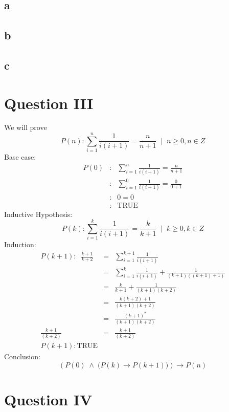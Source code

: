 \documentclass{article}
\begin{document}
\subsection*{a}

\subsection*{b}

\subsection*{c}

\section*{Question III}
We will prove
$$
P(n) \colon \sum^n_{i=1} \frac{1}{i(i+1)} = \frac{n}{n+1} \;\; \biggr | \;\; n \geq 0, n \in Z
$$
Base case:
\begin{eqnarray*}
P(0) &\colon& \sum^n_{i=1} \frac{1}{i(i+1)} = \frac{n}{n+1} \\
&\colon& \sum^0_{i=1} \frac{1}{i(i+1)} = \frac{0}{0+1} \\
&\colon& 0 = 0 \\
&\colon& \textrm{TRUE}
\end{eqnarray*}
Inductive Hypothesis:
$$
P(k) \colon \sum^k_{i=1} \frac{1}{i(i+1)} = \frac{k}{k+1} \;\; \biggr | \;\; k \geq 0, k \in Z
$$
Induction:
\begin{eqnarray*}
P(k+1) \colon \;\; \frac{k+1}{k+2} &=& \sum^{k+1}_{i=1} \frac{1}{i(i+1)}  \\
&=& \sum^k_{i=1} \frac{1}{i(i+1)} + \frac{1}{(k+1)((k+1)+1)} \\
&=& \frac{k}{k+1} + \frac{1}{(k+1)(k+2)} \\ 
&=& \frac{k(k+2) + 1}{(k+1)(k+2)} \\ 
&=& \frac{(k+1)^2}{(k+1)(k+2)} \\
\frac{k+1}{(k+2)} &=& \frac{k+1}{(k+2)} \\
P(k+1) \colon \textrm{TRUE}
\end{eqnarray*}
Conclusion:
$$
\left (  P(0) \; \land \; \biggr ( P(k) \rightarrow P(k+1) \biggr ) \right ) \rightarrow P(n) 
$$

\section*{Question IV}
\end{document}

